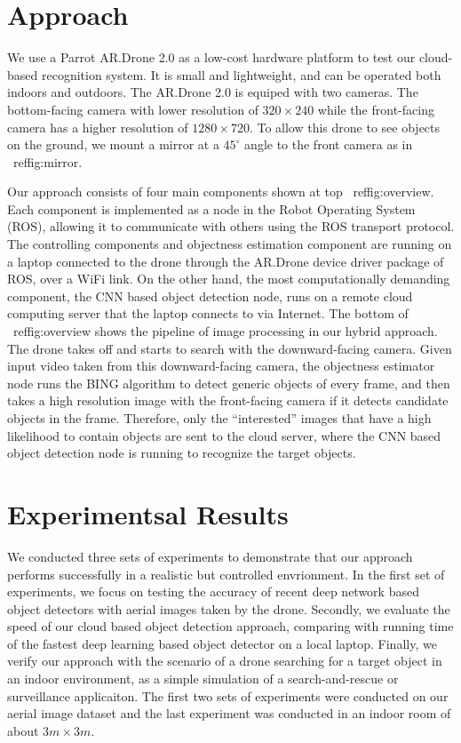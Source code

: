 \section{Approach}
We use a Parrot AR.Drone 2.0 as a low-cost hardware platform
to test our cloud-based recognition system. It is small and lightweight, and can be operated both indoors and outdoors.
The AR.Drone 2.0 is equiped with two cameras. 
The bottom-facing camera with lower resolution of $320 \times 240$ while the front-facing camera has a higher resolution of $1280 \times 720$. 
To allow this drone to see objects on the ground, we mount a mirror at a $45^{\circ}$ angle to the front camera as in ~ref{fig:mirror}.

Our approach consists of four main components shown at top ~ref{fig:overview}. Each component is implemented as a node in the Robot Operating System (ROS), allowing it to communicate with others using the ROS transport protocol.
The controlling components and objectness estimation component are running on a laptop connected to the drone through the AR.Drone device driver package of ROS, over a WiFi link. On the other hand, the most computationally demanding component, the CNN based object detection node, runs on a remote cloud computing server that the laptop connects to via Internet.
The bottom of ~ref{fig:overview} shows the pipeline of image processing in our hybrid approach. 
The drone takes off and starts to search with the downward-facing camera. Given input video taken from this downward-facing camera, the objectness estimator node runs the BING algorithm to detect generic objects of every frame, and then takes a high resolution image with the front-facing camera if it detects candidate objects in the frame.
Therefore, only the ``interested'' images that have a high likelihood to contain objects are sent to the cloud server, where the CNN based object detection node is running to recognize the target objects.

\section{Experimentsal Results}
We conducted three sets of experiments to demonstrate that our approach performs successfully in a realistic but controlled envrionment. 
In the first set of experiments, we focus on testing the accuracy of recent deep network based object detectors with aerial images taken by the drone.
Secondly, we evaluate the speed of our cloud based object detection approach, comparing with running time of the fastest deep learning based object detector on a local laptop. Finally, we verify our approach with the scenario of a drone searching for a target object in an indoor environment, as a simple simulation of a search-and-rescue or surveillance applicaiton. The first two sets of experiments were conducted on our aerial image dataset and the last experiment was conducted in an indoor room of about $3m \times 3m$.

